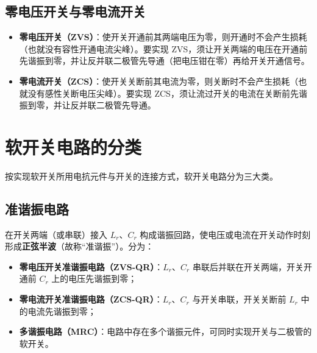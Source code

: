 \subsection{零电压开关与零电流开关}

\begin{itemize}
  \item \textbf{零电压开关（ZVS）}：使开关开通前其两端电压为零，则开通时不会产生损耗（也就没有容性开通电流尖峰）。要实现 ZVS，须让开关两端的电压在开通前先谐振到零，并让反并联二极管先导通（把电压钳在零）再给开关开通信号。
  \item \textbf{零电流开关（ZCS）}：使开关关断前其电流为零，则关断时不会产生损耗（也就没有感性关断电压尖峰）。要实现 ZCS，须让流过开关的电流在关断前先谐振到零，并让反并联二极管先导通。
\end{itemize}


\section{软开关电路的分类}

按实现软开关所用电抗元件与开关的连接方式，软开关电路分为三大类。

\subsection{准谐振电路}

在开关两端（或串联）接入 $L_r$、$C_r$ 构成谐振回路，使电压或电流在开关动作时刻形成\textbf{正弦半波}（故称“准谐振”）。分为：

\begin{itemize}
  \item \textbf{零电压开关准谐振电路（ZVS-QR）}：$L_r$、$C_r$ 串联后并联在开关两端，开关开通前 $C_r$ 上的电压先谐振到零；
  \item \textbf{零电流开关准谐振电路（ZCS-QR）}：$L_r$、$C_r$ 与开关串联，开关关断前 $L_r$ 中的电流先谐振到零；
  \item \textbf{多谐振电路（MRC）}：电路中存在多个谐振元件，可同时实现开关与二极管的软开关。
\end{itemize}

